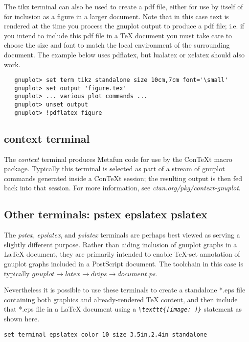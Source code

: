 \documentclass[letterpaper,11pt]{article}
\begin{document}
The tikz terminal can also be used to create a pdf file, either for use by
itself of for inclusion as a figure in a larger document.  Note that in this
case text is rendered at the time you process the gnuplot output to produce
a pdf file; i.e. if you intend to include this pdf file in a {\TeX} document
you must take care to choose the size and font to match the local environment
of the surrounding document.
The example below uses pdflatex, but lualatex or xelatex should also work. 
\begin{verbatim}
   gnuplot> set term tikz standalone size 10cm,7cm font='\small'
   gnuplot> set output 'figure.tex'
   gnuplot> ... various plot commands ...
   gnuplot> unset output
   gnuplot> !pdflatex figure
\end{verbatim}

\newpage

\subsection*{context terminal}

The {\em context} terminal produces Metafun code for use by the 
ConTeXt macro package. Typically this terminal is selected as part of a stream
of gnuplot commands generated inside a ConTeXt session; the resulting output
is then fed back into that session.
For more information, see {\em ctan.org/pkg/context-gnuplot}.

\subsection*{Other terminals: pstex epslatex pslatex}

The {\em pstex}, {\em epslatex}, and {\em pslatex} terminals are perhaps
best viewed as serving a slightly different purpose.
Rather than aiding inclusion of gnuplot graphs in a {\LaTeX} document,
they are primarily intended to enable {\TeX}-set annotation of gnuplot graphs
included in a PostScript document.  The toolchain in this case is typically
{$ gnuplot \rightarrow latex \rightarrow dvips \rightarrow document.ps$}.

Nevertheless it is possible to use these terminals to create a standalone
*.eps file containing both graphics and already-rendered {\TeX} content,
and then include that *.eps file in a {\LaTeX} document using a
{\em {\verb+\texttt{[image: ]}+}} statement as shown here.

\begin{verbatim}
set terminal epslatex color 10 size 3.5in,2.4in standalone
\end{verbatim}
\end{document}
